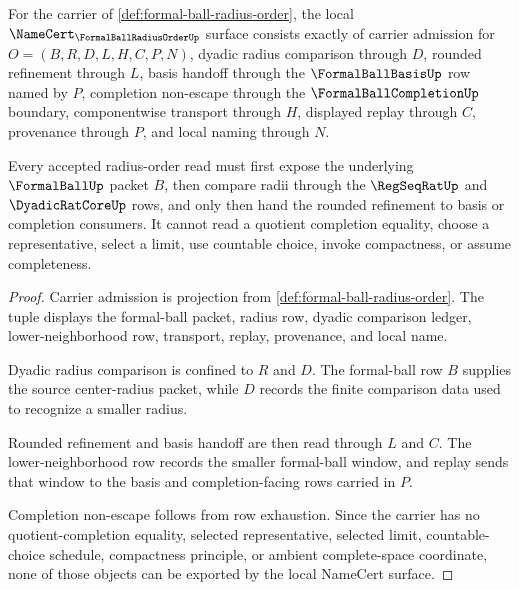 \begin{theorem}
\label{thm:formal-ball-radius-order-namecert-obligations}
For the carrier of \autoref{def:formal-ball-radius-order}, the local $\NameCert_{\FormalBallRadiusOrderUp}$ surface consists exactly of carrier admission for $O=(B,R,D,L,H,C,P,N)$, dyadic radius comparison through $D$, rounded refinement through $L$, basis handoff through the $\FormalBallBasisUp$ row named by $P$, completion non-escape through the $\FormalBallCompletionUp$ boundary, componentwise transport through $H$, displayed replay through $C$, provenance through $P$, and local naming through $N$.

Every accepted radius-order read must first expose the underlying $\FormalBallUp$ packet $B$, then compare radii through the $\RegSeqRatUp$ and $\DyadicRatCoreUp$ rows, and only then hand the rounded refinement to basis or completion consumers. It cannot read a quotient completion equality, choose a representative, select a limit, use countable choice, invoke compactness, or assume completeness.
\end{theorem}
\begin{proof}
Carrier admission is projection from \autoref{def:formal-ball-radius-order}. The tuple displays the formal-ball packet, radius row, dyadic comparison ledger, lower-neighborhood row, transport, replay, provenance, and local name.

Dyadic radius comparison is confined to $R$ and $D$. The formal-ball row $B$ supplies the source center-radius packet, while $D$ records the finite comparison data used to recognize a smaller radius.

Rounded refinement and basis handoff are then read through $L$ and $C$. The lower-neighborhood row records the smaller formal-ball window, and replay sends that window to the basis and completion-facing rows carried in $P$.

Completion non-escape follows from row exhaustion. Since the carrier has no quotient-completion equality, selected representative, selected limit, countable-choice schedule, compactness principle, or ambient complete-space coordinate, none of those objects can be exported by the local NameCert surface.
\end{proof}

